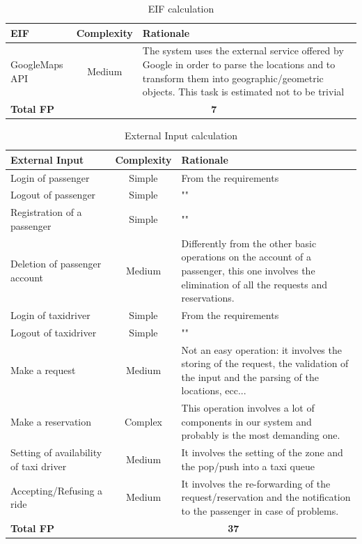 \begin{table}[H]
\centering
\begin{tabular}{ l | c | p{} }
\textbf{EIF} & \textbf{Complexity} & \textbf{Rationale} \\ \hline
GoogleMaps API & Medium & The system uses the external service offered by Google in order to parse the locations and to transform them into geographic/geometric objects. This task is estimated not to be trivial\\ \hline
\textbf{Total FP} & \multicolumn{2}{c}{\textbf{7}}
\end{tabular}
\caption{EIF calculation}
\end{table}

\begin{table}[H]
\centering
\begin{tabular}{ p{} | c | p{} }
\textbf{External Input} & \textbf{Complexity} & \textbf{Rationale} \\ \hline
Login of passenger & Simple & From the requirements\\  \hline
Logout of passenger & Simple & "" \\ \hline
Registration of a passenger & Simple & "" \\ \hline
Deletion of passenger account & Medium & Differently from the other basic operations on the account of a passenger, this one involves the elimination of all the requests and reservations. \\ \hline
Login of taxidriver & Simple & From the requirements \\  \hline
Logout of taxidriver & Simple & "" \\ \hline
Make a request & Medium & Not an easy operation: it involves the storing of the request, the validation of the input and the parsing of the locations, ecc... \\ \hline
Make a reservation & Complex & This operation involves a lot of components in our system and probably is the most demanding one. \\ \hline
Setting of availability of taxi driver & Medium & It involves the setting of the zone and the pop/push into a taxi queue \\ \hline
Accepting/Refusing a ride & Medium & It involves the re-forwarding of the request/reservation and the notification to the passenger in case of problems. \\ \hline
\textbf{Total FP} & \multicolumn{2}{c}{\textbf{37}}
\end{tabular}
\caption{External Input calculation}
\end{table}

